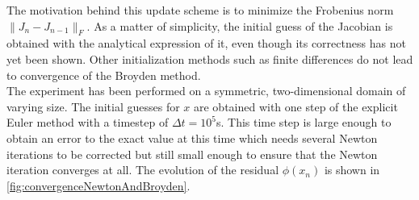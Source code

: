 \documentclass{report}
\begin{document}
The motivation behind this update scheme is to minimize the Frobenius norm $\|J_n - J_{n-1}\|_F$. As a matter of simplicity, the initial guess of the Jacobian is obtained with the analytical expression of it, even though its correctness has not yet been shown. Other initialization methods such as finite differences do not lead to convergence of the Broyden method. \\
The experiment has been performed on a symmetric, two-dimensional domain of varying size. The initial guesses for $x$ are obtained with one step of the explicit Euler method with a timestep of $\Delta t = 10^5$s. This time step is large enough to obtain an error to the exact value at this time which needs several Newton iterations to be corrected but still small enough to ensure that the Newton iteration converges at all. The evolution of the residual $\phi(x_n)$ is shown in \autoref{fig:convergenceNewtonAndBroyden}.
\end{document}
